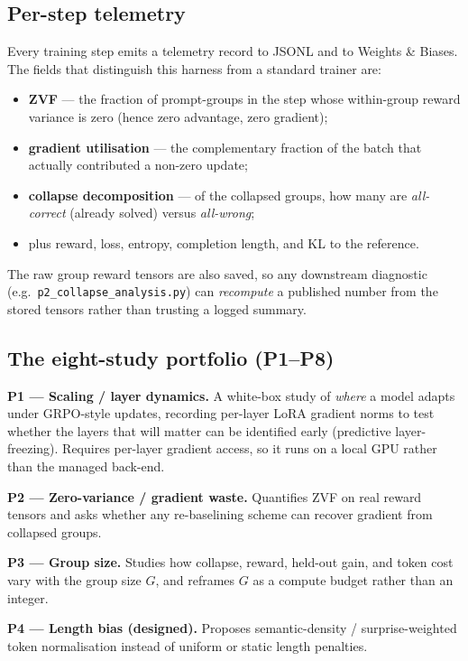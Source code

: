 \documentclass[12pt,a4paper]{report}
\begin{document}
\subsection{Per-step telemetry}
Every training step emits a telemetry record to JSONL and to Weights \& Biases.
The fields that distinguish this harness from a standard trainer are:
\begin{itemize}[leftmargin=1.4em,itemsep=1pt]
  \item \textbf{ZVF} --- the fraction of prompt-groups in the step whose
  within-group reward variance is zero (hence zero advantage, zero gradient);
  \item \textbf{gradient utilisation} --- the complementary fraction of the batch
  that actually contributed a non-zero update;
  \item \textbf{collapse decomposition} --- of the collapsed groups, how many are
  \emph{all-correct} (already solved) versus \emph{all-wrong};
  \item plus reward, loss, entropy, completion length, and KL to the reference.
\end{itemize}
The raw group reward tensors are also saved, so any downstream diagnostic
(e.g.\ \texttt{p2\_collapse\_analysis.py}) can \emph{recompute} a published number
from the stored tensors rather than trusting a logged summary.

\subsection{The eight-study portfolio (P1--P8)}

\textbf{P1 --- Scaling / layer dynamics.} A white-box study of \emph{where} a model
adapts under GRPO-style updates, recording per-layer LoRA gradient norms to test
whether the layers that will matter can be identified early (predictive
layer-freezing). Requires per-layer gradient access, so it runs on a local GPU
rather than the managed back-end.

\textbf{P2 --- Zero-variance / gradient waste.} Quantifies ZVF on real reward
tensors and asks whether any re-baselining scheme can recover gradient from
collapsed groups.

\textbf{P3 --- Group size.} Studies how collapse, reward, held-out gain, and token
cost vary with the group size $G$, and reframes $G$ as a compute budget rather
than an integer.

\textbf{P4 --- Length bias (designed).} Proposes semantic-density / surprise-weighted
token normalisation instead of uniform or static length penalties.
\end{document}
